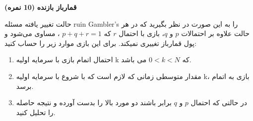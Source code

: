 \Large \textbf{قمارباز بازنده}
\large \textbf{(10 نمره)}

\normalsize \vspace{0.5cm}

حالت تغییر یافته مسئله ruin Gambler's را به این صورت در نظر بگیرید که در هر حالت علاوه بر احتمالات $p$ و $q$،‌ بازی با احتمال $r$ که
$p + q + r = 1$
، مساوی می‌شود و پول قمارباز تغییری نمیکند. برای این بازی موارد زیر را حساب کنید:

\begin{enumerate}[label=(\alph*)]
	
	\item
	احتمال اتمام بازی با سرمایه اولیه k که
	$0 < k < N$
	می باشد.
	\item
	مقدار متوسطی زمانی که لازم است که با شروع با سرمایه اولیه k، بازی به اتمام برسد.
	\item
	در حالتی که احتمال $p$ و $q$ برابر باشند دو مورد بالا را بدست آورده و نتیجه حاصله را تحلیل کنید.
	
\end{enumerate}